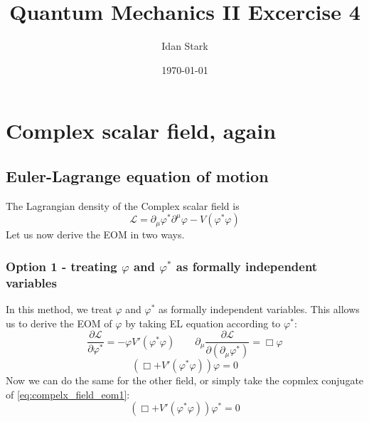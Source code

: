 \documentclass{article}
\title{Quantum Mechanics II Excercise 4}
\author{Idan Stark}
\date{\today}
\let\breaklesssection\section
\renewcommand\section{\clearpage\breaklesssection}
\begin{document}
\maketitle

\breaklesssection{Complex scalar field, again}
\subsection{Euler-Lagrange equation of motion}
The Lagrangian density of the Complex scalar field is
\begin{equation}
\label{eq:complex-lagrangian}
    \mathcal{L} = \partial_\mu \varphi^* \partial^\mu \varphi - V(\varphi^*\varphi)
\end{equation}
Let us now derive the EOM in two ways.
\subsubsection{Option 1 - treating $\varphi$ and $\varphi^*$ as formally independent variables}
In this method, we treat $\varphi$ and $\varphi^*$ as formally independent variables. This allows us to derive the EOM of $\varphi$ by taking EL equation according to $\varphi^*$:
\begin{equation}
    \frac{\partial \mathcal{L}}{\partial \varphi^*} = - \varphi V'(\varphi^*\varphi)
    \qquad
    \partial_\mu \frac{\partial \mathcal{L}}{\partial\left(\partial_\mu \varphi^*\right)} = \Box\varphi
\end{equation}
\begin{equation}
\label{eq:compelx_field_eom1}
    \left(\Box + V'(\varphi^*\varphi)\right)\varphi = 0
\end{equation}
Now we can do the same for the other field, or simply take the copmlex conjugate of  \ref{eq:compelx_field_eom1}:
\begin{equation}
    \left(\Box + V'(\varphi^*\varphi)\right)\varphi^* = 0
\end{equation}
\end{document}
